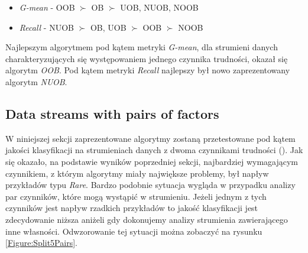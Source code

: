 \begin{itemize}
    \item \textit{G-mean} - OOB $\succ$ OB $\succ$ UOB, NUOB, NOOB
    \item \textit{Recall} - NUOB $\succ$ OB, UOB $\succ$ OOB $\succ$ NOOB
\end{itemize}

\noindent Najlepszym algorytmem pod kątem metryki \textit{G-mean}, dla strumieni danych charakteryzujących się występowaniem jednego czynnika trudności, okazał się algorytm \textit{OOB}. Pod kątem metryki \textit{Recall} najlepszy był nowo zaprezentowany algorytm \textit{NUOB}.

\newpage

\subsection{Data streams with pairs of factors}

\noindent W niniejszej sekcji zaprezentowane algorytmy zostaną przetestowane pod kątem jakości klasyfikacji na strumieniach danych z dwoma czynnikami trudności (). Jak się okazało, na podstawie wyników poprzedniej sekcji, najbardziej wymagającym czynnikiem, z którym algorytmy miały największe problemy, był napływ przykładów typu \textit{Rare}. Bardzo podobnie sytuacja wygląda w przypadku analizy par czynników, które mogą wystąpić w strumieniu. Jeżeli jednym z tych czynników jest napływ rzadkich przykładów to jakość klasyfikacji jest zdecydowanie niższa aniżeli gdy dokonujemy analizy strumienia zawierającego inne własności. Odwzorowanie tej sytuacji można zobaczyć na rysunku \ref{Figure:Split5Pairs}.

